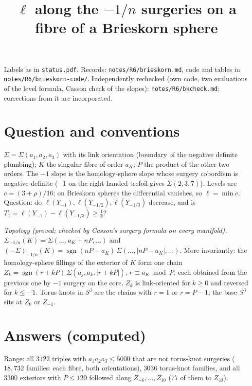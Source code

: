 \documentclass[10pt]{amsart}
\title{$\ell$ along the $-1/n$ surgeries on a fibre of a Brieskorn sphere}
\date{}
\newcommand{\st}[1]{\par\noindent\textit{#1}\enspace}
\begin{document}
\sloppy
\maketitle
\vspace{-2.5em}

\noindent Labels as in \texttt{status.pdf}. Records: \texttt{notes/R6/brieskorn.md},
code and tables in \texttt{notes/R6/brieskorn-code/}. Independently rechecked (own code, two evaluations of the level formula, Casson check of the slopes): \texttt{notes/R6/bkcheck.md}; corrections from it are incorporated.

\section{Question and conventions}

$\Sigma=\Sigma(a_1,a_2,a_3)$ with its link orientation (boundary of the negative
definite plumbing); $K$ the singular fibre of order $a_K$; $P$ the product of the
other two orders. The $-1$ slope is the homology-sphere slope whose surgery
cobordism is negative definite ($-1$ on the right-handed trefoil gives
$\Sigma(2,3,7)$). Levels are $c=(3+\rho)/16$; on Brieskorn spheres the
differential vanishes, so $\ell=\min c$. Question: do
$\ell(Y_{-1}),\ell(Y_{-1/2}),\ell(Y_{-1/3})$ decrease, and is
$T_1=\ell(Y_{-1})-\ell(Y_{-1/3})\ge\frac18$?

\st{Topology (proved; checked by Casson's surgery formula on every manifold).}
$\Sigma_{-1/n}(K)=\Sigma(\dots,a_K+nP,\dots)$ and
$(-\Sigma)_{-1/n}(K)=\operatorname{sgn}(nP-a_K)\,\Sigma(\dots,|nP-a_K|,\dots)$.
More invariantly: the homology-sphere fillings of the exterior of $K$ form one
chain $Z_k=\operatorname{sgn}(r+kP)\,\Sigma(a_j,a_k,|r+kP|)$, $r\equiv a_K\bmod P$,
each obtained from the previous one by $-1$ surgery on the core. $Z_k$ is
link-oriented for $k\ge0$ and reversed for $k\le-1$. Torus knots in $S^3$ are
the chains with $r=1$ or $r=P-1$; the base $S^3$ sits at $Z_0$ or $Z_{-1}$.

\section{Answers (computed)}

Range: all $3122$ triples with $a_1a_2a_3\le5000$ that are not torus-knot
surgeries ($18{,}732$ families: each fibre, both orientations), $3036$
torus-knot families, and all $3300$ exteriors with $P\le120$ followed along
$Z_{-6},\dots,Z_{10}$ (77 of them to $Z_{40}$).
\end{document}
